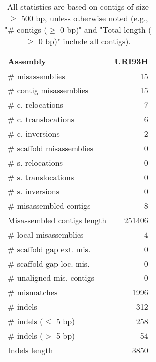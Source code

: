 \documentclass[12pt,a4paper]{article}
\begin{document}
\begin{table}[ht]
\begin{center}
\caption{All statistics are based on contigs of size $\geq$ 500 bp, unless otherwise noted (e.g., "\# contigs ($\geq$ 0 bp)" and "Total length ($\geq$ 0 bp)" include all contigs).}
\begin{tabular}{|l*{1}{|r}|}
\hline
Assembly & URI93H \\ \hline
\# misassemblies & 15 \\ \hline
\hspace{2mm}\# contig misassemblies & 15 \\ \hline
\hspace{5mm}\# c. relocations & 7 \\ \hline
\hspace{5mm}\# c. translocations & 6 \\ \hline
\hspace{5mm}\# c. inversions & 2 \\ \hline
\hspace{2mm}\# scaffold misassemblies & 0 \\ \hline
\hspace{5mm}\# s. relocations & 0 \\ \hline
\hspace{5mm}\# s. translocations & 0 \\ \hline
\hspace{5mm}\# s. inversions & 0 \\ \hline
\# misassembled contigs & 8 \\ \hline
Misassembled contigs length & 251406 \\ \hline
\# local misassemblies & 4 \\ \hline
\# scaffold gap ext. mis. & 0 \\ \hline
\# scaffold gap loc. mis. & 0 \\ \hline
\# unaligned mis. contigs & 0 \\ \hline
\# mismatches & 1996 \\ \hline
\# indels & 312 \\ \hline
\hspace{5mm}\# indels ($\leq$ 5 bp) & 258 \\ \hline
\hspace{5mm}\# indels ($>$ 5 bp) & 54 \\ \hline
Indels length & 3850 \\ \hline
\end{tabular}
\end{center}
\end{table}
\end{document}
